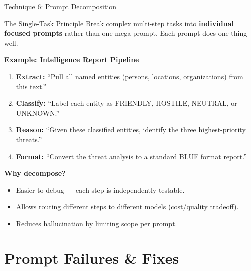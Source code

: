 \documentclass{beamer}
\begin{document}
\begin{frame}{Technique 6: Prompt Decomposition}
    \begin{block}{The Single-Task Principle}
        Break complex multi-step tasks into \textbf{individual focused prompts} rather
        than one mega-prompt. Each prompt does one thing well.
    \end{block}

    \vspace{0.2cm}
    \textbf{Example: Intelligence Report Pipeline}
    \begin{enumerate}
        \item \textbf{Extract:} ``Pull all named entities (persons, locations, organizations) from this text.''
        \item \textbf{Classify:} ``Label each entity as FRIENDLY, HOSTILE, NEUTRAL, or UNKNOWN.''
        \item \textbf{Reason:} ``Given these classified entities, identify the three highest-priority threats.''
        \item \textbf{Format:} ``Convert the threat analysis to a standard BLUF format report.''
    \end{enumerate}

    \vspace{0.2cm}
    \textbf{Why decompose?}
    \begin{itemize}
        \item Easier to debug --- each step is independently testable.
        \item Allows routing different steps to different models (cost/quality tradeoff).
        \item Reduces hallucination by limiting scope per prompt.
    \end{itemize}
\end{frame}

\section{Prompt Failures \& Fixes}
\end{document}
